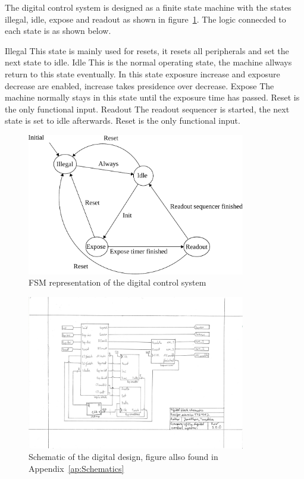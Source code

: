 The digital control system is designed as a finite state machine with the states illegal, idle, expose and readout as shown in figure~\ref{fig:fsmDiagram}.
The logic connecded to each state is as shown below.

\begin{outline}
  \1 Illegal
  \2 This state is mainly used for resets, it resets all peripherals and set the next state to idle.
  \1 Idle
  \2 This is the normal operating state, the machine allways return to this state eventually.
  \2 In this state exposure increase and exposure decrease are enabled, increase takes presidence over decrease.
  \1 Expose
  \2 The machine normally stays in this state until the exposure time has passed.
  \2 Reset is the only functional input.
  \1 Readout
  \2 The readout sequencer is started, the next state is set to idle afterwards.
  \2 Reset is the only functional input.
\end{outline}


\begin{figure}[htbp]
  \centering
  \includegraphics[width=0.85\textwidth]{figures/fsmDiagram}
  \caption{FSM representation of the digital control system}
  \label{fig:fsmDiagram}
\end{figure}
\begin{figure}[htbp]
  \centering
  \includegraphics[width=0.85\textwidth]{figures/SchematicDigital}
  \caption{Schematic of the digital design, figure allso found in Appendix~\ref{ap:Schematics}}
  \label{fig:digschematic}
\end{figure}